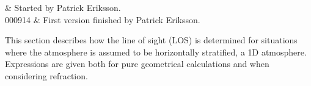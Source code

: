 %
%
 \label{sec:los}


%
%
 & Started by Patrick Eriksson. \\
  000914 & First version finished by Patrick Eriksson.\\
\stophistory


%
%
%



%
%
This section describes how the line of sight (LOS) is determined
for situations where the atmosphere is assumed to be horizontally
stratified, a 1D atmosphere. Expressions are given both for pure
geometrical calculations and when considering refraction.



